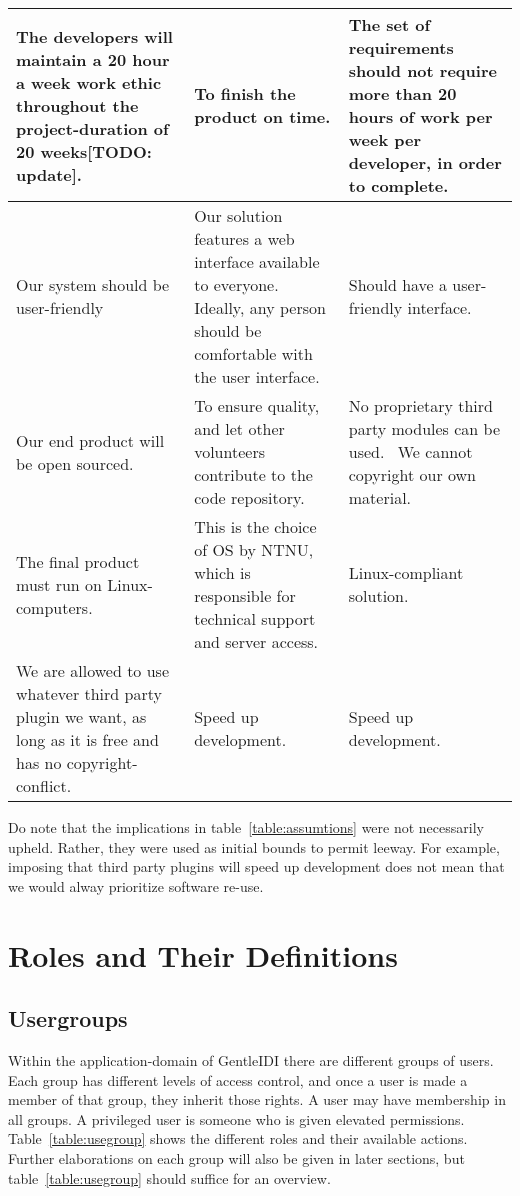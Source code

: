 \begin{longtable}{|p{}|p{}|p{}|}
The developers will maintain a 20 hour a week work ethic throughout the
project{}-duration of 20 weeks[TODO: update]. & To finish the product on time.
& The set of requirements should not require more than 20 hours of work per
week per developer, in order to complete.\\\hline
Our system should be user{}-friendly &
Our solution features a web interface available to everyone. Ideally,
any person should be comfortable with the user interface. &
Should have a user{}-friendly interface.
\\\hline
Our end product will be open sourced. &
To ensure quality, and let other volunteers contribute to the code
repository. &
No proprietary third party modules can be used. \ We cannot copyright
our own material. \\\hline
The final product must run on Linux{}-computers. &
This is the choice of OS by NTNU, which is responsible for technical
support and server access. &
Linux{}-compliant solution.\\\hline
We are allowed to use whatever third party plugin we want, as long as it
is free and has no copyright{}-conflict. &
Speed up development. &
Speed up development.\\\hline
\end{longtable}

Do note that the implications in table~\ref{table:assumtions} were not necessarily upheld.
Rather, they were used as initial bounds to permit leeway. For example,
imposing that third party plugins will speed up development does not
mean that we would alway prioritize software re-use.

\section{Roles and Their Definitions}
\subsection{Usergroups}
Within the application-domain of
GentleIDI there are different
groups of users. Each group has different levels of access control, and
once a user is made a member of that group, they inherit those rights.
A user may have membership in all groups. A privileged user is someone
who is given elevated permissions. Table~\ref{table:usegroup} shows the
different roles and their available actions. Further elaborations on
each group will also be given in later sections, but table~\ref{table:usegroup} should
suffice for an overview.

